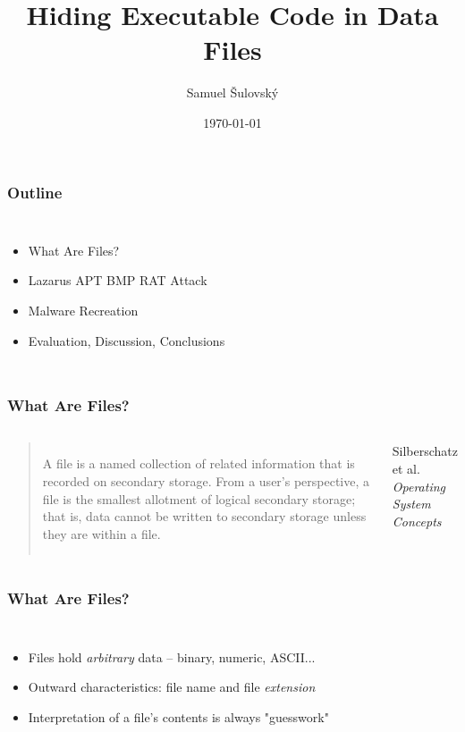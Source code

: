 \documentclass[fleqn]{beamer}
\title{Hiding Executable Code in Data Files}
\author{Samuel Šulovský}
\institute[University of Vienna]{Faculty of Computer Science, University of Vienna}
\date{\today}
\begin{document}
\begin{frame}
  \titlepage
\end{frame}

\begin{frame}
  \frametitle{Outline}
  \begin{columns}[T]
    \column{\textwidth}
    \begin{itemize}
      \item What Are Files?
      \item Lazarus APT BMP RAT Attack
      \item Malware Recreation
      \item Evaluation, Discussion, Conclusions
    \end{itemize}
  \end{columns}
\end{frame}


\begin{frame}
  \frametitle{What Are Files?}
  \begin{columns}[T]
    \column{\textwidth}
    \begin{quote}
      A file is a named collection of related information that is recorded on secondary storage. From a user's perspective, 
      a file is the smallest allotment of logical secondary storage; that is, data cannot be written to secondary storage 
      unless they are within a file.
    \end{quote}
    Silberschatz et al. \emph{Operating System Concepts}
  \end{columns}
\end{frame}

\begin{frame}
  \frametitle{What Are Files?}
  \begin{columns}[T]
    \column{\textwidth}
    \begin{itemize}
      \item Files hold \emph{arbitrary} data -- binary, numeric, ASCII...
      \item Outward characteristics: file name and file \emph{extension}
      \item Interpretation of a file's contents is always "guesswork" 
    \end{itemize}
  \end{columns}
\end{frame}
\end{document}
